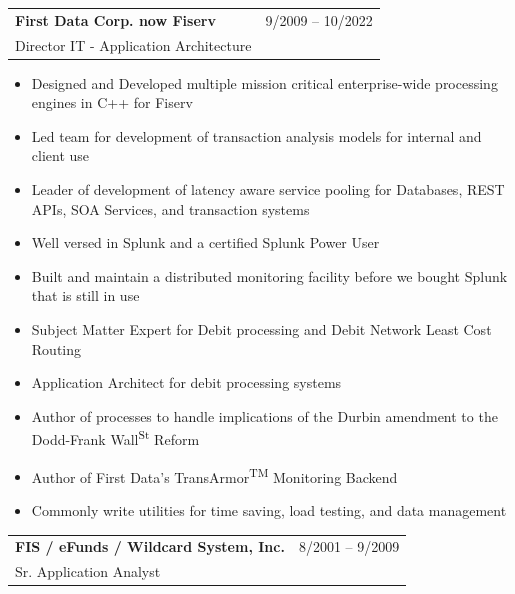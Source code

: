 \documentclass[10pt]{report}
\begin{document}
\noindent
\begin{tabular}{ L{.5\textwidth}  R{.4\textwidth} }
	\textbf{\large First Data Corp. now Fiserv} & 9/2009 -- 10/2022 \\
	{Director IT - Application Architecture} &
\end{tabular}


\begin{itemize}
	\item Designed and Developed multiple mission critical enterprise-wide processing engines in C++ for Fiserv
	\item Led team for development of transaction analysis models for internal and client use
	\item Leader of development of latency aware service pooling for Databases, REST APIs, SOA Services, and transaction systems
	\item Well versed in Splunk and a certified Splunk Power User
	\item Built and maintain a distributed monitoring facility before we bought Splunk that is still in use
	\item Subject Matter Expert for Debit processing and Debit Network Least Cost Routing
	\item Application Architect for debit processing systems
	\item Author of processes to handle implications of the Durbin amendment to the Dodd-Frank Wall\textsuperscript{\tiny St} Reform
	\item Author of First Data's TransArmor\textsuperscript{\tiny TM} Monitoring Backend
	\item Commonly write utilities for time saving, load testing, and data management
\end{itemize}
\bigskip

\noindent
\begin{tabular}{ L{.5\textwidth}  R{.4\textwidth} }
\textbf{\large FIS / eFunds / Wildcard System, Inc.} & 8/2001 -- 9/2009 \\
Sr. Application Analyst &
\end{tabular}
\end{document}
